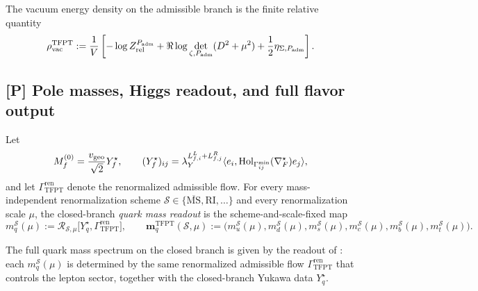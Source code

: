 \begin{conjecture}
\label{thm:relative_admissible_vacuum_energy_finiteness}
The vacuum energy density on the admissible branch is the finite relative quantity
\[
\rho_{\mathrm{vac}}^{\mathrm{TFPT}}
:=
\frac1V\left[-\log Z_{\mathrm{rel}}^{P_{\mathrm{adm}}}+\Re\log\det_{\zeta,P_{\mathrm{adm}}}(D^2+\mu^2)+\frac12\eta_{\Sigma,P_{\mathrm{adm}}}\right].
\]
\end{conjecture}

\subsection{[P] Pole masses, Higgs readout, and full flavor output}

\begin{definition}
\label{def:scheme-fixed-yukawa-kernel}
Let
\[
M_f^{(0)}=\frac{v_{\mathrm{geo}}}{\sqrt2}Y_f^\star,
\qquad
(Y_f^\star)_{ij}
=
\lambda_Y^{L_{f,i}^L+L_{f,j}^R}
\langle e_i,\mathrm{Hol}_{\Gamma_{ij}^{\min}}(\nabla_F^\star)e_j\rangle,
\]
and let $\Gamma_{\mathrm{TFPT}}^{\mathrm{ren}}$ denote the renormalized admissible flow. For every
mass-independent renormalization scheme $\mathcal S\in\{\overline{\mathrm{MS}},\mathrm{RI},\dots\}$
and every renormalization scale $\mu$, the closed-branch \emph{quark mass readout} is the
scheme-and-scale-fixed map
\[
m_q^{\mathcal S}(\mu)
:=
\mathcal R_{\mathcal S,\mu}\bigl[Y_q^\star,\Gamma_{\mathrm{TFPT}}^{\mathrm{ren}}\bigr],
\qquad
\mathbf m_q^{\mathrm{TFPT}}(\mathcal S,\mu)
:=
\bigl(m_u^{\mathcal S}(\mu),m_d^{\mathcal S}(\mu),m_s^{\mathcal S}(\mu),
m_c^{\mathcal S}(\mu),m_b^{\mathcal S}(\mu),m_t^{\mathcal S}(\mu)\bigr).
\]
\end{definition}

\begin{conjecture}
\label{thm:closed_pole_mass_completion}
The full quark mass spectrum on the closed branch is given by the readout of
: each $m_q^{\mathcal S}(\mu)$ is determined by the same
renormalized admissible flow $\Gamma_{\mathrm{TFPT}}^{\mathrm{ren}}$ that controls the lepton sector,
together with the closed-branch Yukawa data $Y_q^\star$.
\end{conjecture}


